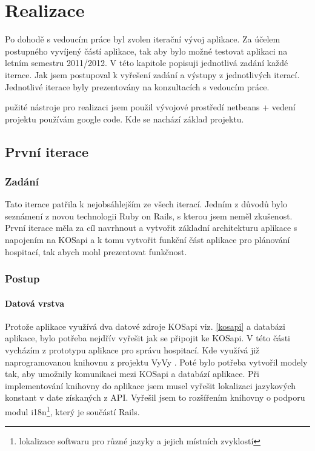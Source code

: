 \chapter{Realizace}
Po dohodě s vedoucím práce byl zvolen iterační vývoj aplikace. Za účelem postupného vyvíjený částí aplikace, tak aby bylo možné testovat aplikaci na letním semestru 2011/2012. V této kapitole popisuji jednotlivá zadání každé iterace. Jak jsem postupoval k vyřešení zadání a výstupy z jednotlivých iterací. Jednotlivé iterace byly prezentovány na konzultacích s vedoucím práce.

pužité nástroje pro realizaci jsem použil vývojové prostředí netbeans + vedení projektu používám google code. Kde se nachází základ projektu.

\section{První iterace}
\subsection{Zadání}
Tato iterace patřila k nejobsáhlejším ze všech iterací. Jedním z důvodů bylo  seznámení z novou technologii Ruby on Rails, s kterou jsem neměl zkušenost. První iterace měla za cíl navrhnout a vytvořit základní architekturu aplikace s napojením na KOSapi \cite{kosapi} a k tomu vytvořit funkční část aplikace pro plánování hospitací, tak abych mohl prezentovat funkčnost.

\subsection{Postup}
\subsubsection{Datová vrstva}
Protože aplikace využívá dva datové zdroje KOSapi viz. \ref{kosapi} a databázi aplikace, bylo potřeba nejdřív vyřešit jak se připojit ke KOSapi. V této části vycházím z prototypu aplikace pro správu hospitací. Kde využívá již naprogramovanou knihovnu z projektu VyVy \cite{vyvy}. Poté bylo potřeba vytvořil modely tak, aby umožnily komunikaci mezi KOSapi a databází aplikace. Při implementování knihovny do aplikace jsem musel vyřešit lokalizaci jazykových konstant v date získaných z API. Vyřešil jsem to rozšířením knihovny o podporu modul i18n\footnote{lokalizace softwaru pro různé jazyky a jejich místních zvyklostí}, který je součástí Rails.


